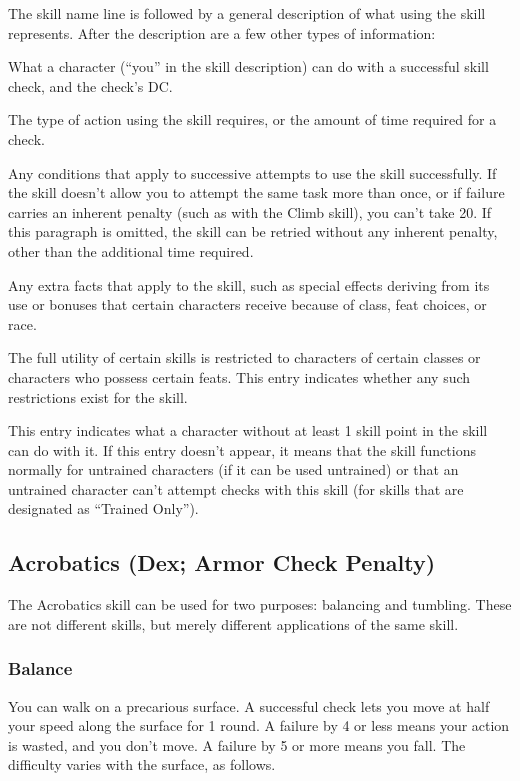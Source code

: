 \par The skill name line is followed by a general description of what using the skill represents. After the description are a few other types of information:

 What a character (``you'' in the skill description) can do with a successful skill check, and the check's DC.

 The type of action using the skill requires, or the amount of time required for a check.

 Any conditions that apply to successive attempts to use the skill successfully. If the skill doesn't allow you to attempt the same task more than once, or if failure carries an inherent penalty (such as with the Climb skill), you can't take 20. If this paragraph is omitted, the skill can be retried without any inherent penalty, other than the additional time required.

 Any extra facts that apply to the skill, such as special effects deriving from its use or bonuses that certain characters receive because of class, feat choices, or race.

 The full utility of certain skills is restricted to characters of certain classes or characters who possess certain feats. This entry indicates whether any such restrictions exist for the skill.

 This entry indicates what a character without at least 1 skill point in the skill can do with it. If this entry doesn't appear, it means that the skill functions normally for untrained characters (if it can be used untrained) or that an untrained character can't attempt checks with this skill (for skills that are designated as ``Trained Only'').

\subsection{Acrobatics (Dex; Armor Check Penalty)}
The Acrobatics skill can be used for two purposes: balancing and tumbling. These are not different skills, but merely different applications of the same skill.
\subsubsection{Balance}
 You can walk on a precarious surface. A successful check lets you move at half your speed along the surface for 1 round. A failure by 4 or less means your action is wasted, and you don't move. A failure by 5 or more means you fall. The difficulty varies with the surface, as follows.

